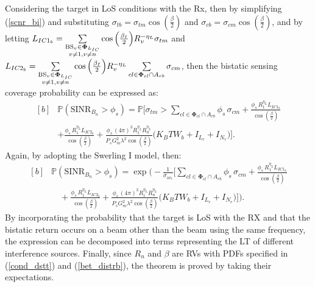 \documentclass[journal]{IEEEtran}
\begin{document}
Considering the target in LoS conditions with the  Rx, then by simplifying (\ref{scnr_bi}) and substituting $\sigma_{tb}=\sigma_{tm} \cos{\left(\frac{\beta}{2}\right)}$ and $\sigma_{cb}=\sigma_{cm}\cos{\left(\frac{\beta}{2}\right)}$, and by letting 
$L_{IC1_b}= \sum\limits_{\substack{\text{BS}_{v}\in \bold\Phi_{L_{IC}}\\ v \neq 1, v \neq n}} \cos{\left(\frac{\beta_I}{2}\right)} R_v^{-\eta_L} \sigma_{tm}$  and  $L_{IC2_b}= \sum\limits_{\substack{\text{BS}_{v}\in \bold\Phi_{L_{IC}}\\ v \neq 1, v \neq n}} \cos{\left(\frac{\beta_I}{2}\right)} R_v^{-\eta_L} \sum\limits_{cl\in\bold\Phi_{cl}\cap A_{rb}} \sigma_{cm}$, then
the bistatic sensing coverage probability can be expressed as:
\small
\begin{equation}\label{rad_cov1_b}
\begin{aligned}[b]
&\mathbb{P} \left(\text{SINR}_{B_n} > \phi_s \right) 
= \mathbb{P} \bigg[\sigma_{tm} > \sum\limits_{cl \in \boldsymbol{\Phi}_{cl} \cap A_{rb}} \phi_s \, \sigma_{cm} 
+ \frac{\phi_s \, R_1^{\eta_L} L_{IC1_b}}{\cos{\left(\frac{\beta}{2}\right)}} \\
&+ \frac{\phi_s \, R_1^{\eta_L} L_{IC2_b}}{\cos{\left(\frac{\beta}{2}\right)}} + \frac{\phi_s \, (4\pi)^3 R_1^{\eta_L} R_n^{\eta_L}}{P_s G_{m}^2 \lambda^2 \cos{\left(\frac{\beta}{2}\right)}} 
\big(K_B T W_b + I_{L_r} + I_{N_r} \big) \bigg].
\end{aligned}
\end{equation}
\normalsize
Again, by adopting the Swerling I model, then:
\small
\begin{equation}
\begin{aligned}[b]
\!\!\!&\mathbb{P} \left(\text{SINR}_{B_n} > \phi_s \right) 
= \exp\bigg( - \frac{1}{\sigma_{\text{av}_t}} \bigg[ \sum\limits_{cl \in \boldsymbol{\Phi}_{cl} \cap A_{rb}} \phi_s \, \sigma_{cm} 
+ \frac{\phi_s \, R_1^{\eta_L} L_{IC1_b}}{\cos{\left(\frac{\beta}{2}\right)}} \\
\!\!\!&\quad + \frac{\phi_s \, R_1^{\eta_L} L_{IC2_b}}{\cos{\left(\frac{\beta}{2}\right)}} 
+ \frac{\phi_s \, (4\pi)^3 R_1^{\eta_L} R_n^{\eta_L}}{P_s G_{m}^2 \lambda^2 \cos{\left(\frac{\beta}{2}\right)}} 
\big(K_B T W_b + I_{L_r} + I_{N_r} \big) \bigg] \bigg).
\end{aligned}
\end{equation}
\normalsize
By incorporating the probability that the target is LoS with the RX and that the bistatic return occurs on a beam other than the beam using the same frequency, the expression can be decomposed into terms representing the LT of different interference sources.
Finally, since $R_n$ and $\beta$ are RVs with PDFs specified in (\ref{cond_dstt}) and (\ref{bet_distrb}), the theorem is proved by taking their expectations.
\end{document}
